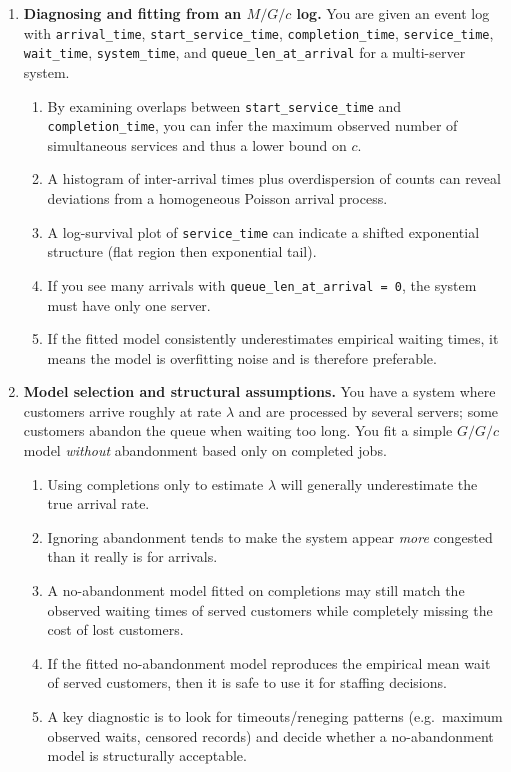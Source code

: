 \documentclass[a4paper,11pt]{article}
\begin{document}
\begin{enumerate}
\item \textbf{Diagnosing and fitting from an $M/G/c$ log.} You are given an event log with \texttt{arrival\_time}, \texttt{start\_service\_time}, \texttt{completion\_time}, \texttt{service\_time}, \texttt{wait\_time}, \texttt{system\_time}, and \texttt{queue\_len\_at\_arrival} for a multi-server system.
  \begin{enumerate}
    \item By examining overlaps between \texttt{start\_service\_time} and \texttt{completion\_time}, you can infer the maximum observed number of simultaneous services and thus a lower bound on $c$.
    \item A histogram of inter-arrival times plus overdispersion of counts can reveal deviations from a homogeneous Poisson arrival process.
    \item A log-survival plot of \texttt{service\_time} can indicate a shifted exponential structure (flat region then exponential tail).
    \item If you see many arrivals with \texttt{queue\_len\_at\_arrival = 0}, the system must have only one server.
    \item If the fitted model consistently underestimates empirical waiting times, it means the model is overfitting noise and is therefore preferable.
  \end{enumerate}

\item \textbf{Model selection and structural assumptions.} You have a system where customers arrive roughly at rate $\lambda$ and are processed by several servers; some customers abandon the queue when waiting too long. You fit a simple $G/G/c$ model \emph{without} abandonment based only on completed jobs.
  \begin{enumerate}
    \item Using completions only to estimate $\lambda$ will generally underestimate the true arrival rate.
    \item Ignoring abandonment tends to make the system appear \emph{more} congested than it really is for arrivals.
    \item A no-abandonment model fitted on completions may still match the observed waiting times of served customers while completely missing the cost of lost customers.
    \item If the fitted no-abandonment model reproduces the empirical mean wait of served customers, then it is safe to use it for staffing decisions.
    \item A key diagnostic is to look for timeouts/reneging patterns (e.g.\ maximum observed waits, censored records) and decide whether a no-abandonment model is structurally acceptable.
  \end{enumerate}


\end{enumerate}
\end{document}
